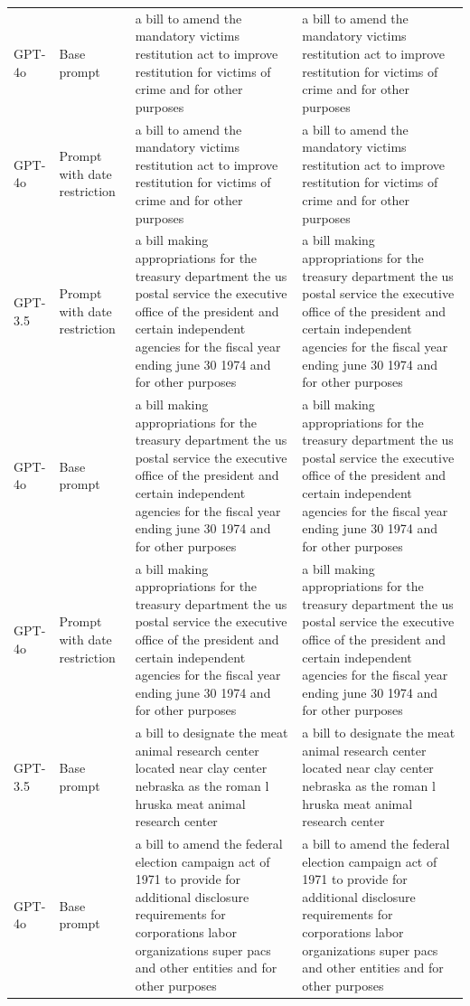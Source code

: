 \begin{longtable}{>{\raggedright\arraybackslash}p{1.4cm}>{\raggedright\arraybackslash}p{1.4cm}>{\raggedright\arraybackslash}p{5.5cm}>{\raggedright\arraybackslash}p{5.5cm}}
GPT-4o & Base prompt & a bill to amend the mandatory victims restitution act to improve restitution for victims of crime and for other purposes & a bill to amend the mandatory victims restitution act to improve restitution for victims of crime and for other purposes\\
GPT-4o & Prompt with date restriction & a bill to amend the mandatory victims restitution act to improve restitution for victims of crime and for other purposes & a bill to amend the mandatory victims restitution act to improve restitution for victims of crime and for other purposes\\
GPT-3.5 & Prompt with date restriction & a bill making appropriations for the treasury department the us postal service the executive office of the president and certain independent agencies for the fiscal year ending june 30 1974 and for other purposes & a bill making appropriations for the treasury department the us postal service the executive office of the president and certain independent agencies for the fiscal year ending june 30 1974 and for other purposes\\
GPT-4o & Base prompt & a bill making appropriations for the treasury department the us postal service the executive office of the president and certain independent agencies for the fiscal year ending june 30 1974 and for other purposes & a bill making appropriations for the treasury department the us postal service the executive office of the president and certain independent agencies for the fiscal year ending june 30 1974 and for other purposes\\
GPT-4o & Prompt with date restriction & a bill making appropriations for the treasury department the us postal service the executive office of the president and certain independent agencies for the fiscal year ending june 30 1974 and for other purposes & a bill making appropriations for the treasury department the us postal service the executive office of the president and certain independent agencies for the fiscal year ending june 30 1974 and for other purposes\\
GPT-3.5 & Base prompt & a bill to designate the meat animal research center located near clay center nebraska as the roman l hruska meat animal research center & a bill to designate the meat animal research center located near clay center nebraska as the roman l hruska meat animal research center\\
GPT-4o & Base prompt & a bill to amend the federal election campaign act of 1971 to provide for additional disclosure requirements for corporations labor organizations super pacs and other entities and for other purposes & a bill to amend the federal election campaign act of 1971 to provide for additional disclosure requirements for corporations labor organizations super pacs and other entities and for other purposes\\

\end{longtable}
